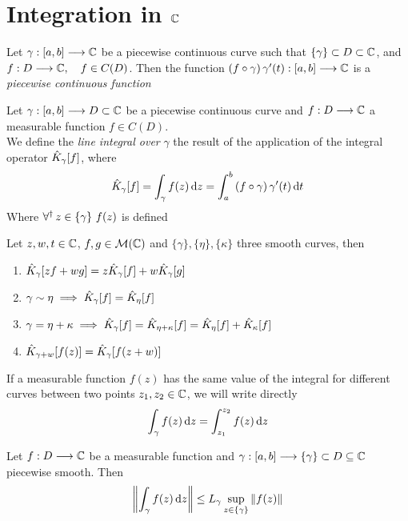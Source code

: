 \documentclass[../complete.tex]{subfiles}
\begin{document}
\section{Integration in $\mathbb{C}$}
\begin{dfn}
	Let $\gamma:[a,b]\overset{}{\longrightarrow}\mathbb{C}$ be a piecewise continuous curve such that $\{\gamma\}\subset D\subset\mathbb{C}$, and $f:D\overset{}{\longrightarrow}\mathbb{C},\quad f\in C(D)$. Then the function $\left( f\circ\gamma \right)\gamma'(t):[a,b]\overset{}{\longrightarrow}\mathbb{C}$ is a \textit{piecewise continuous function}
\end{dfn}
\begin{dfn}
	Let $\gamma:[a,b]\overset{}{\longrightarrow} D\subset\mathbb{C}$ be a piecewise continuous curve and $f:D\overset{}{\longrightarrow}\mathbb{C}$ a measurable function $f\in C(D)$.\\
	We define the \textit{line integral over }$\gamma$ the result of the application of the integral operator $\hat{K}_\gamma[f]$, where
	\begin{equation}
		\hat{K}_\gamma[f]=\int_{\gamma}^{}f(z)\operatorname{d\!} z=\int_{a}^{b}\left( f\circ\gamma \right)\gamma'(t)\operatorname{d\!} t
		\label{eq:lineintcf}
	\end{equation}
	Where $\operatorname{\forall^\dagger} z\in\{\gamma\}\ f(z)$ is defined
\end{dfn}
\begin{thm}
	Let $z,w,t\in\mathbb{C}$, $f,g\in\mathcal{M}(\mathbb{C})$ and $\{\gamma\},\{\eta\},\{\kappa\}$ three smooth curves, then
	\begin{enumerate}
	\item $\hat{K}_\gamma[zf+wg]=z\hat{K}_\gamma[f]+w\hat{K}_\gamma[g]$
	\item $\gamma\sim\eta\implies\hat{K}_\gamma[f]=\hat{K}_\eta[f]$
	\item $\gamma=\eta+\kappa\implies\hat{K}_{\gamma}[f]=\hat{K}_{\eta+\kappa}[f]=\hat{K}_\eta[f]+\hat{K}_\kappa[f]$
	\item $\hat{K}_{\gamma+w}[f(z)]=\hat{K}_\gamma[f(z+w)]$
	\end{enumerate}
\end{thm}
\begin{ntn}
	If a measurable function $f(z)$ has the same value of the integral for different curves between two points $z_1,z_2\in\mathbb{C}$, we will write directly
	\begin{equation*}
		\int_{\gamma}^{}f(z)\operatorname{d\!} z=\int_{z_1}^{z_2}f(z)\operatorname{d\!} z
	\end{equation*}
\end{ntn}
\begin{thm}
	Let $f:D\overset{}{\longrightarrow}\mathbb{C}$ be a measurable function and $\gamma:[a,b]\overset{}{\longrightarrow}\{\gamma\}\subset D\subseteq\mathbb{C}$ piecewise smooth. Then
	\begin{equation*}
		\norm{\int_{\gamma}^{}f(z)\operatorname{d\!} z}\le L_\gamma\sup_{z\in\{\gamma\}}\norm{f(z)}
	\end{equation*}
\end{thm}
\end{document}
